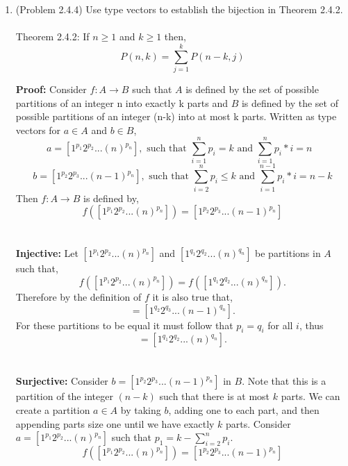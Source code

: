 \documentclass{amsart}
\begin{document}
\begin{enumerate}
\item (Problem 2.4.4)  Use type vectors to establish the bijection in Theorem 2.4.2.\\\\
Theorem 2.4.2: If $n\geq1$ and $k\geq1$ then, 
\begin{equation*}
P(n,k) = \sum_{j = 1}^{k} P(n-k,j)
\end{equation*}


\noindent\textbf{Proof:} Consider $f: A \to B$ such that $A$ is defined by the set of possible partitions of an integer n into exactly k parts and $B$ is defined by the set of possible partitions of an integer (n-k) into at most k parts. Written as type vectors for $a \in A$ and $b \in B$,
\begin{equation}
a = [1^{p_1}  2^{p_2}...(n)^{p_{n}}],  \text{ such that $\sum_{i = 1}^{n}p_i = k$ and $\sum_{i = 1}^{n}p_i*i = n$ }
\end{equation}
\begin{equation}
b = [1^{p_2}  2^{p_3}...(n-1)^{p_{n}}],  \text{ such that $\sum_{i = 2}^{n}p_i \leq k$ and $\sum_{i = 1}^{n-1}p_i*i = n-k$}
\end{equation}
Then $f: A \to B$ is defined by,
\begin{equation*}
f([1^{p_1} 2^{p_2}...(n)^{p_{n}}]) = [1^{p_2} 2^{p_3}...(n-1)^{p_n}]
\end{equation*}\\\\




\textbf{Injective:} Let $[1^{p_1}  2^{p_2}...(n)^{p_{n}}]$ and $[1^{q_1}  2^{q_2}...(n)^{q_{n}}]$ be partitions in $A$ such that, 
\begin{equation*}
f([1^{p_1} 2^{p_2}...(n)^{p_{n}}]) = f([1^{q_1} 2^{q_2}...(n)^{q_{n}}]).
\end{equation*}
Therefore by the definition of $f$ it is also true that,
\begin{equation*}
[1^{p_2}  2^{p_3}...(n-1)^{p_{n}}] = [1^{q_2}  2^{q_3}...(n-1)^{q_{n}}].
\end{equation*}
For these partitions to be equal it must follow that $p_i=q_i$ for all $i$, thus 
\begin{equation*}
[1^{p_1}  2^{p_2}...(n)^{p_{n}}] = [1^{q_1}  2^{q_2}...(n)^{q_{n}}].
\end{equation*}\\\\


\textbf{Surjective: } Consider $b = [1^{p_2}  2^{p_3}...(n-1)^{p_{n}}]$ in $B$. Note that this is a partition of the integer $(n-k)$ such that there is at most $k$ parts. We can create a partition  $a \in A$ by taking $b$, adding one to each part, and then appending parts size one until we have exactly $k$ parts. Consider $a = [1^{p_1} 2^{p_2}...(n)^{p_{n}}]$ such that ${p_1} = k-\sum_{i = 2}^{n}p_i$. 
\begin{equation*}
f([1^{p_1} 2^{p_2}...(n)^{p_{n}}]) = [1^{p_2} 2^{p_3}...(n-1)^{p_n}]
\end{equation*}\\
\vspace{1in}






\end{enumerate}
\end{document}
